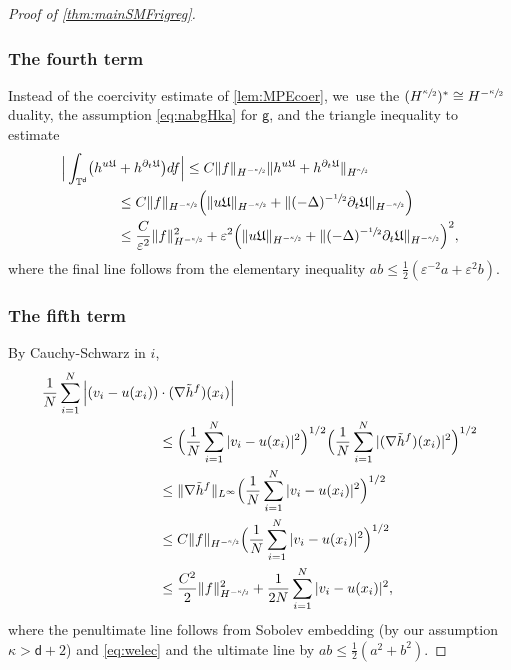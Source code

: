 \documentclass[10pt]{amsart}
\theoremstyle{plain}
\theoremstyle{definition}
\let\div\relax
\DeclareMathOperator{\div}{\mathrm{div}}
\newcommand{\T}{{\mathbb{T}}}
\let\vep\varepsilon
\let\ka\kappa
\let\nab\nabla
\let\p\partial
\let\tl\tilde
\newcommand{\Uu}{\mathfrak{U}}
\renewcommand{\d}{\mathsf{d}}
\newcommand{\g}{{\mathsf{g}}}
\begin{document}
\begin{proof}[Proof of \cref{thm:mainSMFrigreg}]
\subsubsection*{The fourth term} Instead of the coercivity estimate of \cref{lem:MPEcoer}, we~use the $(H^{\sfrac{\ka}{2}})^* \cong H^ {-\sfrac{\ka}{2}}$ duality, the assumption \eqref{eq:nabgHka} for $\g$, and the triangle inequality to estimate
\begin{equation}\label{eq:Gronreg1'}
\begin{aligned}
\Big|\int_{\T^\d}\bigl(\div h^{u\Uu}&+h^{\p_t\Uu}\bigr)df\Big| \le C\|f\|_{H^ {-\sfrac{\ka}{2}}} \|\div h^{u\Uu}+h^{\p_t\Uu}\|_{H^{\sfrac{\ka}{2}}}\\
&\le C\|f\|_{H^ {-\sfrac{\ka}{2}}} \Big( \|u\Uu\|_{H^ {-\sfrac{\ka}{2}}} + \|(-\Delta)^{-\sfrac{1}{2}}\p_t \Uu\|_{H^ {-\sfrac{\ka}{2}}}\Big)\\
&\le \frac{C}{\vep^2}\|f\|_{H^ {-\sfrac{\ka}{2}}}^2 + \vep^2 \Big( \|u\Uu\|_{H^ {-\sfrac{\ka}{2}}} + \|(-\Delta)^{-\sfrac{1}{2}}\p_t \Uu\|_{H^ {-\sfrac{\ka}{2}}}\Big)^2,
\end{aligned}
\end{equation}
where the final line follows from the elementary inequality $ab\le \frac12(\vep^{-2}a + \vep^2b)$.

\subsubsection*{The fifth term} By Cauchy-Schwarz in $i$,
\begin{equation}\label{eq:Gronreg2}
\begin{aligned}
\frac1N\sum_{i=1}^N \Big|(v_i-u(x_i))&\cdot(\nab\tl{h}^f)(x_i)\Big|\\
&\le \Big(\frac1N\sum_{i=1}^N |v_i-u(x_i)|^2\Big)^{1/2} \Big(\frac1N\sum_{i=1}^N |(\nab\tl{h}^f)(x_i)|^2\Big)^{1/2}\\
&\le \|\nab\tl{h}^{f}\|_{L^\infty} \Big(\frac1N\sum_{i=1}^N |v_i-u(x_i)|^2\Big)^{1/2}\\
&\le C\|f\|_{H^ {-\sfrac{\ka}{2}}}\Big(\frac1N\sum_{i=1}^N |v_i-u(x_i)|^2\Big)^{1/2}\\
&\le \frac{C^2}{2}\|f\|_{H^ {-\sfrac{\ka}{2}}}^2 + \frac{1}{2N}\sum_{i=1}^N |v_i-u(x_i)|^2,
\end{aligned}
\end{equation}
where the penultimate line follows from Sobolev embedding (by our assumption {$\ka>\d+2$}) and \eqref{eq:welec} and the ultimate line by $ab\le \frac12(a^2+b^2)$.


\end{proof}
\end{document}
